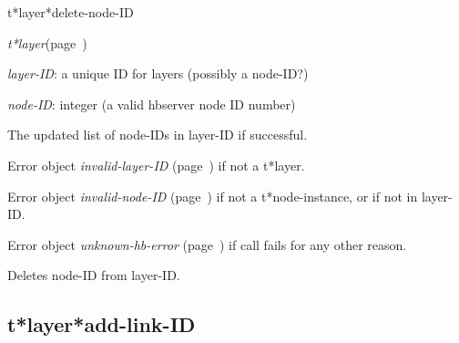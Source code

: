 \begin{description}
\item [Name:]  t*layer*delete-node-ID

\item [Class:] {\sl t*layer}\hfill(page~\pageref{t*layer})

\item [Parameters:]
\item {\sl layer-ID}:  a unique ID for layers (possibly a node-ID?)


\item {\sl node-ID}:  
integer (a valid hbserver node ID number)


\item [Return-value:]
The updated list of node-IDs in layer-ID if successful.

Error object {\sl invalid-layer-ID} (page~\pageref{invalid-layer-ID}) if not a t*layer.

Error object {\sl invalid-node-ID} (page~\pageref{invalid-node-ID}) if not a
t*node-instance, or if not in layer-ID.

Error object {\sl unknown-hb-error} (page~\pageref{unknown-hb-error}) if call fails for
any other reason.

\item [Description:]

Deletes node-ID from layer-ID.

\item [Public:]



\end{description}
\horizontalline

\subsection{t*layer*add-link-ID}
\label{t*layer*add-link-ID}

